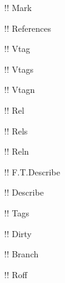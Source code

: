 \documentclass[10pt,a4paper,article,showtrims]{memoir}
\begin{document}
\ttfamily
!\gitMark! Mark

!\gitReferences ! References

!\gitVtag ! Vtag

!\gitVtags ! Vtags

!\gitVtagn ! Vtagn

!\gitRel ! Rel

!\gitRels ! Rels

!\gitReln ! Reln

!\gitFirstTagDescribe ! F.T.Describe

!\gitDescribe ! Describe

!\gitTags ! Tags

!\gitDirty ! Dirty

!\gitBranch ! Branch

!\gitRoff ! Roff
\end{document}
